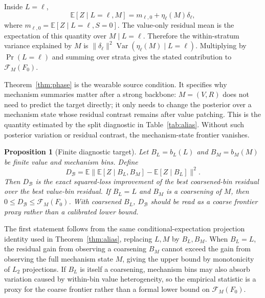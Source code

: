 ﻿\documentclass[10pt,conference]{IEEEtran}
\newtheorem{proposition}{Proposition}
\DeclareMathOperator{\Var}{Var}
\newcommand{\E}{\mathbb{E}}
\begin{document}
\begin{IEEEproof}
Inside \(L=\ell\),
\begin{equation}
\E[Z\mid L=\ell,M]
=m_{\ell,0}+\eta_\ell(M)\delta_\ell ,
\end{equation}
where \(m_{\ell,0}=\E[Z\mid L=\ell,S=0]\).  The value-only residual mean is
the expectation of this quantity over \(M\mid L=\ell\).  Therefore the
within-stratum variance explained by \(M\) is
\(\|\delta_\ell\|^2\Var(\eta_\ell(M)\mid L=\ell)\).  Multiplying by
\(\Pr(L=\ell)\) and summing over strata gives the stated contribution to
\(\mathcal{F}_M(F_0)\).
\end{IEEEproof}

Theorem~\ref{thm:phase} is the wearable source condition.  It specifies why
mechanism summaries matter after a strong backbone: \(M=(V,R)\) does not
need to predict the target directly; it only needs to change the posterior over
a mechanism state whose residual contrast remains after value patching.  This
is the quantity estimated by the split diagnostic in Table~\ref{tab:alias}.
Without such posterior variation or residual contrast, the mechanism-state
frontier vanishes.

\begin{proposition}[Finite diagnostic target]
\label{prop:diagnostic}
Let \(B_L=b_L(L)\) and \(B_M=b_M(M)\) be finite value and mechanism bins.  Define
\begin{equation}
D_{\mathcal{B}}=
\E\|\E[Z\mid B_L,B_M]-\E[Z\mid B_L]\|^2 .
\end{equation}
Then \(D_{\mathcal{B}}\) is the exact squared-loss improvement of the best
coarsened-bin residual over the best value-bin residual.  If \(B_L=L\) and
\(B_M\) is a coarsening of \(M\), then \(0\le D_{\mathcal{B}}\le
\mathcal{F}_M(F_0)\).  With coarsened \(B_L\), \(D_{\mathcal{B}}\) should be
read as a coarse frontier proxy rather than a calibrated lower bound.
\end{proposition}

\begin{IEEEproof}
The first statement follows from the same conditional-expectation projection
identity used in Theorem~\ref{thm:alias}, replacing \(L,M\) by \(B_L,B_M\).
When \(B_L=L\), the residual gain from observing a coarsening \(B_M\) cannot
exceed the gain from observing the full mechanism state \(M\), giving the
upper bound by monotonicity of \(L_2\) projections.  If \(B_L\) is itself a
coarsening, mechanism bins may also absorb variation caused by within-bin
value heterogeneity, so the empirical statistic is a proxy for the coarse
frontier rather than a formal lower bound on \(\mathcal{F}_M(F_0)\).
\end{IEEEproof}
\end{document}
